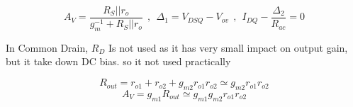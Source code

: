 $$ A_V = \dfrac{R_S || r_o}{g_m^{-1} + R_S||r_o} ~~ , ~~  {\Delta}_1 = V_{DSQ} - V_{ov} ~~ , ~~ I_{DQ} - \frac{{\Delta}_2}{R_{ac}} = 0 $$
\par
\setlength{\parindent}{0.5cm} %
In Common Drain, $R_D$ Is not used as it has very small impact on output gain, but it take down DC bias. so it not used practically
\lipsum[1-4]
\setlength{\parindent}{0.0cm} 
\begin{minipage}[b]{.5\textwidth}
$$ R_{out} = r_{o1} + r_{o2} + g_{m2} r_{o1} r_{o2} \simeq  g_{m2} r_{o1} r_{o2} $$
$$ A_V = g_{m1} R_{out} \simeq g_{m1} g_{m2} r_{o1} r_{o2}$$
\par ~\\
\centering

\end{minipage}%
\noindent
\setlength{\parindent}{0.0cm} 
\hspace*{-\parindent}%
\begin{minipage}[b]{.5\textwidth}
\raggedleft

\end{minipage}%

